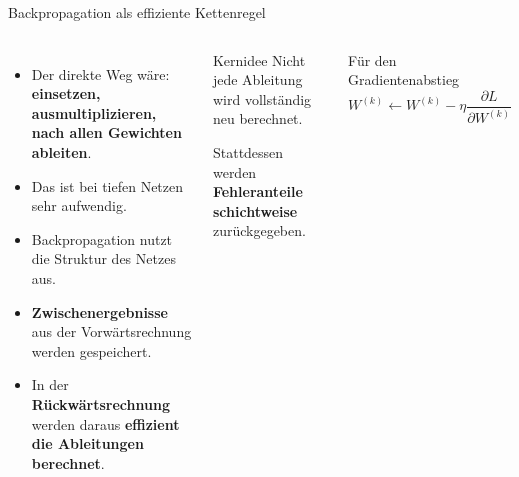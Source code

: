\begin{frame}{Backpropagation als effiziente Kettenregel}
\footnotesize
\begin{columns}

\begin{itemize}

    \item Der direkte Weg wäre:
          \textbf{einsetzen, ausmultiplizieren, nach allen Gewichten ableiten}.

    \item Das ist bei tiefen Netzen sehr aufwendig.

    \item Backpropagation nutzt die Struktur des Netzes aus.

    \item \textbf{Zwischenergebnisse} aus der Vorwärtsrechnung werden gespeichert.

    \item In der \textbf{Rückwärtsrechnung} werden daraus \textbf{effizient die Ableitungen
          berechnet}.
\end{itemize}


\begin{blockC1}{\footnotesize Kernidee}
Nicht jede Ableitung wird vollständig neu berechnet.

\par\medskip

Stattdessen werden \textbf{Fehleranteile schichtweise} zurückgegeben.
\end{blockC1}

\vspace{0.3cm}

\begin{block}{\footnotesize Für den Gradientenabstieg}
\[
    W^{(k)}
    \leftarrow
    W^{(k)}
    -
    \eta
    \frac{\partial L}{\partial W^{(k)}}
\]
\end{block}
\end{columns}
\end{frame}


